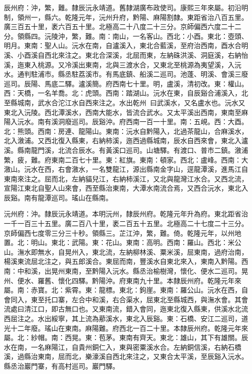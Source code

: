 \begin{pinyinscope}
辰州府：沖，繁，難。隸辰沅永靖道。舊隸湖廣布政使司。康熙三年來屬。初沿明制，領州一，縣六。乾隆元年，沅州升府，黔陽、麻陽割隸。東距省治八百五里。廣三百五十里，袤六百五十里。北極高二十八度二十三分。京師偏西六度二十二分。領縣四。沅陵沖，繁，難。南：南山，一名客山。西北：小酉。東北：壺頭、明月。東南：聖人山。沅水在南，自瀘溪入，東北合藍溪，至府治西南，酉水合明溪、小酉溪自西北來注之。東北合深溪，北屈而東，左納硃洪溪、洞庭溪，右納怡溪，迤東入桃源。又冷溪出東南，北與三渡水合，又東北至桃源為夷望溪，入沅水。通判駐浦市。縣丞駐荔溪市。有馬底鎮、船溪二巡司。池蓬、明溪、會溪三廢巡司。辰陽、馬底二驛。瀘溪簡。府西南七十里。明，盧溪，清初改。東：權山。西：天橋，一名羊喬。北：虎頭。西南：踏湖山。沅水在東，自辰谿合浦溪入，北至縣城南，武水合沱江水自西來注之。水出乾州，曰武溪水，又名盧水也。沅水又東北入沅陵。西北潭溪水，西南大能水，皆流合武水。又太平溪出西南，東南至麻陽入沅水。南有溪洞廢巡司。辰谿沖。府西南一百一十里。南：五峴。西：大酉。北：熊頭。西南：房連、龍陽山。東南：沅水自黔陽入，北過茶龍山，合麻溪水，北入漵浦。又西北復入縣東，右納柿溪，迤西過縣城南，辰水自西來會，東北入瀘溪。縣南龍門溪，北流合辰水。有黃溪口巡司。山塘驛。有渡口、普市二鎮。漵浦繁，疲，難。府東南二百七十里。東：紅旗。東南：頓家。西北：盧峰。西南：大漵山。沅水在西，右會漵水，一名雙龍江，源出縣南金字山，逕龍潭溪，進馬江自東南來注之。屈而北，左納貓兒江，右納柿溪江，又北與龍灣江水合。又西北流，宣陽江東北自聖人山來會，西至縣治東南，大潭水南流合焉，又西合沅水，東北入辰谿。南有龍潭巡司。瑤山在縣南。

沅州府：沖。隸辰沅永靖道。本明沅州，隸辰州府。乾隆元年升為府。東北距省治一千一百三十五里。廣二百八十里，袤二百五十五里。北極高二十七度二十三分。京師偏西七度零三分三十秒。領縣三。芷江沖，繁，難。倚。乾隆元年，以州地置。北：明山。東北：武陽。東：花山。東南：高明。西南：羅山。西北：米公山。潕水即無水，自晃州入，東北流，左納柳林溪、粟米溪，屈東南，過府治南，楊溪東流屈北注之，與五郎溪合。東屈而南，豐溪水自東北來入，東南入黔陽。西南：中和溪，出晃州東南，至黔陽入沅水。縣丞治榆樹灣，懷化、便水二巡司。晃州、便水、羅舊、懷化四驛。黔陽沖。府東南九十里。本隸辰州府。乾隆元年來屬。南：赤寶。北：紫霄。東：龍標。東北：鉤崖。東南：羅公山。沅水在西，自會同入，東至托口寨，左合中和溪，右合渠水，屈東北至縣城西，與潕水會。其會流處曰清江口，即古無口也。又東南流，錯入會同，迤東北復入縣東，供溪水北流西屈注之。水出綏寧，其上流為𦰡溪水，東北入辰谿。東：石橋、安江二巡司，道光十二年廢。瑤山在東南。麻陽難。府西北一百二十里。本隸辰州府。乾隆元年來屬。北：紗帽。南：西晃。東：苞茅。東南有齊天。東北：雄山，其下有雄關。辰水在南，一名麻陽江，自貴州銅仁入，東與密粟溪水合。左納銅信溪，右納石橋溪，過縣治東南，屈而北，樂濠溪自西北來注之，又東合太平溪，至辰谿入沅水。縣丞治巖門寨，有高村巡司。巖門驛。


\end{pinyinscope}
